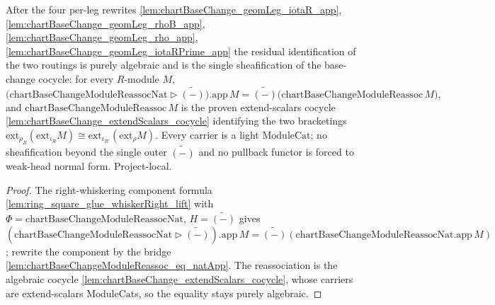 \begin{lemma}
  \label{lem:chartBaseChange_algLeg_cocycle_app}
  After the four per-leg rewrites \cref{lem:chartBaseChange_geomLeg_iotaR_app},
  \cref{lem:chartBaseChange_geomLeg_rhoB_app}, \cref{lem:chartBaseChange_geomLeg_rho_app},
  \cref{lem:chartBaseChange_geomLeg_iotaRPrime_app} the residual identification of the two routings is
  purely algebraic and is the single sheafification of the base-change cocycle: for every \(R\)-module
  \(M\),
  \[
    \bigl(\mathrm{chartBaseChangeModuleReassocNat} \rhd \widetilde{(-)}\bigr).\mathrm{app}\,M
      = \widetilde{(-)}\bigl(\mathrm{chartBaseChangeModuleReassoc}\,M\bigr),
  \]
  and \(\mathrm{chartBaseChangeModuleReassoc}\,M\) is the proven extend-scalars cocycle
  \cref{lem:chartBaseChange_extendScalars_cocycle} identifying the two bracketings
  \(\mathrm{ext}_{\rho_B}(\mathrm{ext}_{\iota_R}M)\cong\mathrm{ext}_{\iota_{R'}}(\mathrm{ext}_{\rho}M)\).
  Every carrier is a light \(\mathrm{ModuleCat}\); no sheafification beyond the single outer
  \(\widetilde{(-)}\) and no pullback functor is forced to weak-head normal form. Project-local.
  \begin{proof}
    The right-whiskering component formula \cref{lem:ring_square_glue_whiskerRight_lift} with
    \(\Phi = \mathrm{chartBaseChangeModuleReassocNat}\), \(H = \widetilde{(-)}\) gives
    \((\mathrm{chartBaseChangeModuleReassocNat} \rhd \widetilde{(-)}).\mathrm{app}\,M
      = \widetilde{(-)}(\mathrm{chartBaseChangeModuleReassocNat}.\mathrm{app}\,M)\); rewrite the
    component by the bridge \cref{lem:chartBaseChangeModuleReassoc_eq_natApp}. The reassociation is the
    algebraic cocycle \cref{lem:chartBaseChange_extendScalars_cocycle}, whose carriers are extend-scalars
    \(\mathrm{ModuleCat}\)s, so the equality stays purely algebraic.
  \end{proof}
\end{lemma}

